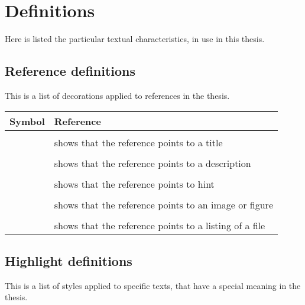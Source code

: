 \chapter*{Definitions}
\label{title:definitions}

Here is listed the particular textual characteristics, in use in this thesis.

\section*{Reference definitions}
\label{tab:definitions_reference}

This is a list of decorations applied to references in the thesis.

\begin{tabular}[htpb]{c | l}
	Symbol & Reference \\
	\hline \\

	\HandRight & shows that the reference points to a title \\
	\hline \\

	\NibSolidRight & shows that the reference points to a description \\
	\hline \\

	\Info & shows that the reference points to hint \\
	\hline \\

	\eye & shows that the reference points to an image or figure \\
	\hline \\

	\smallpencil & shows that the reference points to a listing of a file \\

\end{tabular}

\section*{Highlight definitions}
\label{tab:definitions_highlight}

This is a list of styles applied to specific texts, that have a special meaning
in the thesis.

